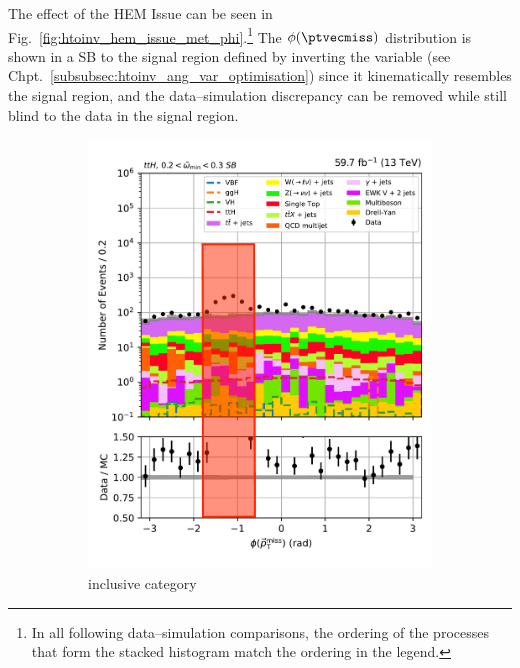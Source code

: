 The effect of the HEM Issue can be seen in Fig.~\ref{fig:htoinv_hem_issue_met_phi}.\footnote{In all following data--simulation comparisons, the ordering of the processes that form the stacked histogram match the ordering in the legend.} The $\phi(\ptvecmiss)$ distribution is shown in a \gls{SB} to the signal region defined by inverting the \omegaTilde variable (see Chpt.~\ref{subsubsec:htoinv_ang_var_optimisation}) since it kinematically resembles the signal region, and the data--simulation discrepancy can be removed while still blind to the data in the signal region.

\begin{figure}[htbp]
    \centering
    \begin{subfigure}[b]{0.4\textwidth}
        \includegraphics[width=\textwidth]{figures/hem_issue/sideband_4/met_phi/met_phi_ttH_before_annotated.pdf}
        \caption{\ttH inclusive category}
    \end{subfigure}
    \hspace{0.1\textwidth}
    \begin{subfigure}[b]{0.4\textwidth}

\end{subfigure}
\end{figure}
